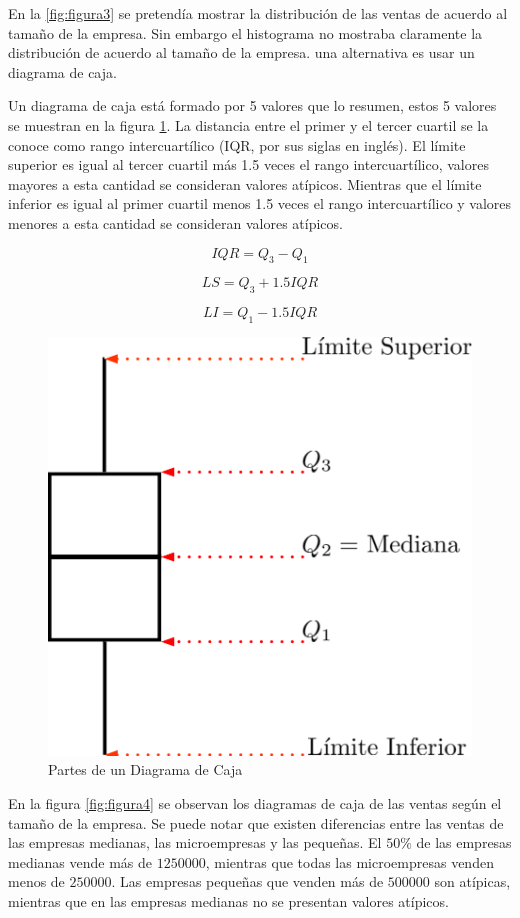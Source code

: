 \documentclass[]{book}
\begin{document}
En la \ref{fig:figura3} se pretendía mostrar la distribución de las
ventas de acuerdo al tamaño de la empresa. Sin embargo el histograma no
mostraba claramente la distribución de acuerdo al tamaño de la empresa.
una alternativa es usar un diagrama de caja.

Un diagrama de caja está formado por 5 valores que lo resumen, estos 5
valores se muestran en la figura \ref{fig:caja1}. La distancia entre el
primer y el tercer cuartil se la conoce como rango intercuartílico (IQR,
por sus siglas en inglés). El límite superior es igual al tercer cuartil
más 1.5 veces el rango intercuartílico, valores mayores a esta cantidad
se consideran valores atípicos. Mientras que el límite inferior es igual
al primer cuartil menos 1.5 veces el rango intercuartílico y valores
menores a esta cantidad se consideran valores atípicos.

\begin{equation} 
  IQR = Q_3 - Q_1
  \label{eq:iqr}
\end{equation}

\begin{equation} 
  LS = Q_3 + 1.5IQR
  \label{eq:ls}
\end{equation}

\begin{equation} 
  LI = Q_1 - 1.5IQR
  \label{eq:li}
\end{equation}

\begin{figure}[h]

{\centering \includegraphics[width=0.4\linewidth]{boxplot3} 

}

\caption{Partes de un Diagrama de Caja}\label{fig:caja1}
\end{figure}

En la figura \ref{fig:figura4} se observan los diagramas de caja de las
ventas según el tamaño de la empresa. Se puede notar que existen
diferencias entre las ventas de las empresas medianas, las microempresas
y las pequeñas. El \(50\%\) de las empresas medianas vende más de
\(1250000\), mientras que todas las microempresas venden menos de
\(250000\). Las empresas pequeñas que venden más de \(500000\) son
atípicas, mientras que en las empresas medianas no se presentan valores
atípicos.
\end{document}

